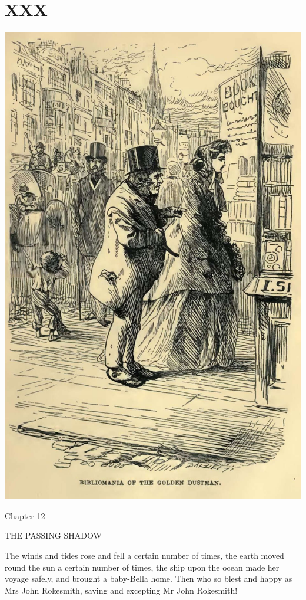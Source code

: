 
\chapter{XXX}

\includegraphics[scale=2.3]{03-05-01}

Chapter 12

THE PASSING SHADOW


The winds and tides rose and fell a certain number of times, the earth
moved round the sun a certain number of times, the ship upon the ocean
made her voyage safely, and brought a baby-Bella home. Then who so blest
and happy as Mrs John Rokesmith, saving and excepting Mr John Rokesmith!

